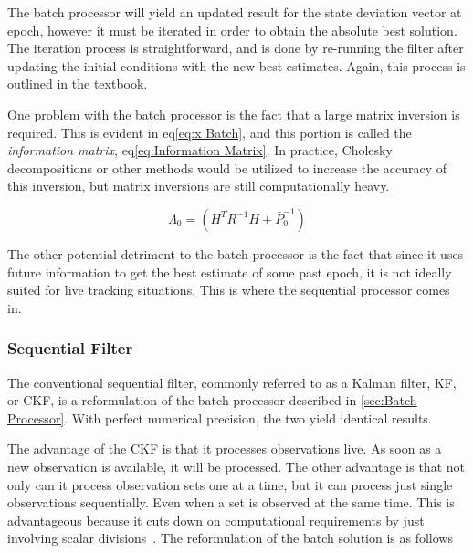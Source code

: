 \documentclass[12pt,a4paper,oneside]{article}
\numberwithin{equation}{section}   		%
\begin{document}
The batch processor will yield an updated result for the state deviation vector at epoch, however it must be iterated in order to obtain the absolute best solution. The iteration process is straightforward, and is done by re-running the filter after updating the initial conditions with the new best estimates. Again, this process is outlined in the textbook. 

One problem with the batch processor is the fact that a large matrix inversion is required. This is evident in eq\eqref{eq:x Batch}, and this portion is called the \emph{information matrix}, eq\eqref{eq:Information Matrix}. In practice, Cholesky decompositions or other methods would be utilized to increase the accuracy of this inversion, but matrix inversions are still computationally heavy. 

\begin{equation}
	\Lambda_0 = (H^T R^{-1} H + \bar{P}_0^{-1})
	\label{eq:Information Matrix}
\end{equation}


The other potential detriment to the batch processor is the fact that since it uses future information to get the best estimate of some past epoch, it is not ideally suited for live tracking situations. This is where the sequential processor comes in. 




\subsubsection{Sequential Filter}
\label{sec:Sequential Filter}

The conventional sequential filter, commonly referred to as a Kalman filter, KF, or CKF, is a reformulation of the batch processor described in \ref{sec:Batch Processor}. With perfect numerical precision, the two yield identical results. 

The advantage of the CKF is that it processes observations live. As soon as a new observation is available, it will be processed. The other advantage is that not only can it process observation sets one at a time, but it can process just single observations sequentially. Even when a set is observed at the same time. This is advantageous because it cuts down on computational requirements by just involving scalar divisions~\cite{tapley2004statistical}. The reformulation of the batch solution is as follows
\end{document}
